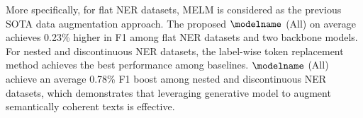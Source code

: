 More specifically, for flat NER datasets, MELM is considered as the previous SOTA data augmentation approach. The proposed ${\modelname}$ (All) on average achieves 0.23\% higher in F1 among flat NER datasets and two backbone models.
For nested and discontinuous NER datasets, 
the label-wise token replacement method achieves the best performance among baselines. ${\modelname}$ (All) achieve an average 0.78\% F1 boost among nested and discontinuous NER datasets, which demonstrates that leveraging generative model to augment semantically coherent texts is effective.
\begin{table}[bt!]
\centering
{}
\end{table}
